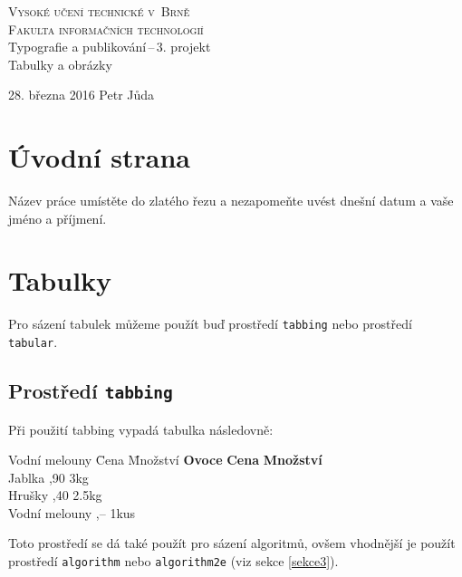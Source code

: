 \documentclass[11pt, a4paper, czech]{article}
\begin{document}
\begin{titlepage}
\begin{center}
\Huge
\textsc{Vysoké učení technické v~Brně\\
\huge
Fakulta informačních technologií\\}
\LARGE
{} Typografie a publikování\,--\,3. projekt\\
\Huge Tabulky a obrázky 
\end{center}
{\Large 28. března 2016 \hfill Petr Jůda}
\end{titlepage}

\section{Úvodní strana}
Název práce umístěte do zlatého řezu a nezapomeňte uvést dnešní datum a vaše jméno a příjmení.
\section{Tabulky}
Pro sázení tabulek můžeme použít buď prostředí \texttt{tabbing} nebo prostředí \texttt{tabular}.
\subsection{Prostředí \texttt{tabbing}}
Při použití tabbing vypadá tabulka následovně:
\begin{tabbing}
	Vodní melouny \quad \= Cena \quad \= Množství \quad \kill
	\textbf{Ovoce} \> \textbf{Cena} \> \textbf{Množství} \\
	Jablka ,90 \> 3kg \\
	Hrušky ,40 \> 2.5kg \\
	Vodní melouny ,-- \> 1kus \\
\end{tabbing}
Toto prostředí se dá také použít pro sázení algoritmů, ovšem vhodnější je použít prostředí \texttt{algorithm} nebo \texttt{algorithm2e} (viz sekce \ref{sekce3}).
\end{document}

